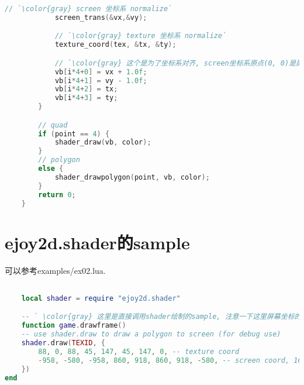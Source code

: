 {\begin{lstlisting}[language=C]
            // `\color{gray} screen 坐标系 normalize`
            screen_trans(&vx,&vy);

            // `\color{gray} texture 坐标系 normalize`
            texture_coord(tex, &tx, &ty);

            // `\color{gray} 这个是为了坐标系对齐, screen坐标系原点(0, 0)是屏幕中间, 现在调整到左下角`
            vb[i*4+0] = vx + 1.0f;
            vb[i*4+1] = vy - 1.0f;
            vb[i*4+2] = tx;
            vb[i*4+3] = ty;
        }

        // quad
        if (point == 4) {
            shader_draw(vb, color);
        }
        // polygon
        else {
            shader_drawpolygon(point, vb, color);
        }
        return 0;
    }
    \end{lstlisting}
}

\section {\ZHH ejoy2d.shader的sample} {
    {可以参考examples/ex02.lua. }\par
    \begin{lstlisting}[language=lua]

    local shader = require "ejoy2d.shader"

    -- ` \color{gray} 这里是直接调用shader绘制的sample, 注意一下这里屏幕坐标的中心原点`
    function game.drawframe()
	-- use shader.draw to draw a polygon to screen (for debug use)
	shader.draw(TEXID, {
		88, 0, 88, 45, 147, 45, 147, 0,	-- texture coord
		-958, -580, -958, 860, 918, 860, 918, -580, -- screen coord, 16x pixel, (0,0) is the center of screen
	})
end

    \end{lstlisting}
}


